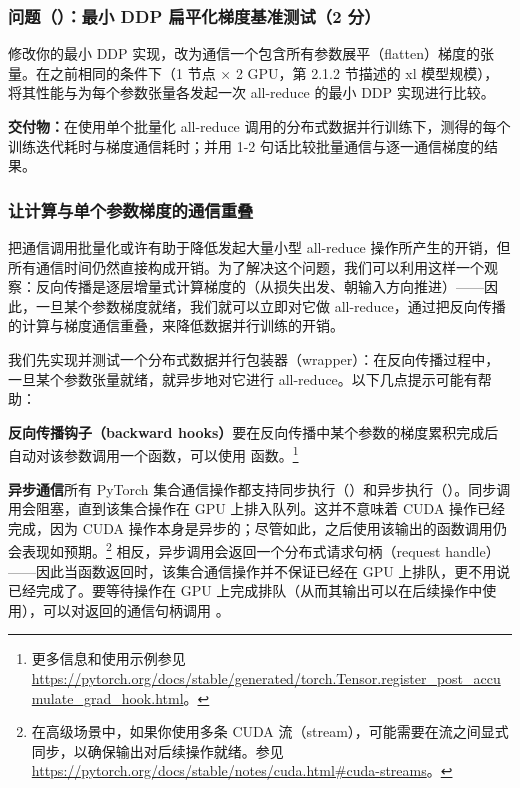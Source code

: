 \subsubsection*{问题（）：最小 DDP 扁平化梯度基准测试（2 分）}

修改你的最小 DDP 实现，改为通信一个包含所有参数展平（flatten）梯度的张量。在之前相同的条件下（1 节点 × 2 GPU，第 2.1.2 节描述的 xl 模型规模），将其性能与为每个参数张量各发起一次 all-reduce 的最小 DDP 实现进行比较。

\textbf{交付物：}在使用单个批量化 all-reduce 调用的分布式数据并行训练下，测得的每个训练迭代耗时与梯度通信耗时；并用 1-2 句话比较批量通信与逐一通信梯度的结果。

\subsubsection{让计算与单个参数梯度的通信重叠}

把通信调用批量化或许有助于降低发起大量小型 all-reduce 操作所产生的开销，但所有通信时间仍然直接构成开销。为了解决这个问题，我们可以利用这样一个观察：反向传播是逐层增量式计算梯度的（从损失出发、朝输入方向推进）——因此，一旦某个参数梯度就绪，我们就可以立即对它做 all-reduce，通过把反向传播的计算与梯度通信重叠，来降低数据并行训练的开销。

我们先实现并测试一个分布式数据并行包装器（wrapper）：在反向传播过程中，一旦某个参数张量就绪，就异步地对它进行 all-reduce。以下几点提示可能有帮助：

\textbf{反向传播钩子（backward hooks）}\quad 要在反向传播中某个参数的梯度累积完成后自动对该参数调用一个函数，可以使用  函数。\footnote{更多信息和使用示例参见 \url{https://pytorch.org/docs/stable/generated/torch.Tensor.register_post_accumulate_grad_hook.html}。}

\textbf{异步通信}\quad 所有 PyTorch 集合通信操作都支持同步执行（）和异步执行（）。同步调用会阻塞，直到该集合操作在 GPU 上排入队列。这并不意味着 CUDA 操作已经完成，因为 CUDA 操作本身是异步的；尽管如此，之后使用该输出的函数调用仍会表现如预期。\footnote{在高级场景中，如果你使用多条 CUDA 流（stream），可能需要在流之间显式同步，以确保输出对后续操作就绪。参见 \url{https://pytorch.org/docs/stable/notes/cuda.html\#cuda-streams}。} 相反，异步调用会返回一个分布式请求句柄（request handle）——因此当函数返回时，该集合通信操作并不保证已经在 GPU 上排队，更不用说已经完成了。要等待操作在 GPU 上完成排队（从而其输出可以在后续操作中使用），可以对返回的通信句柄调用 。


